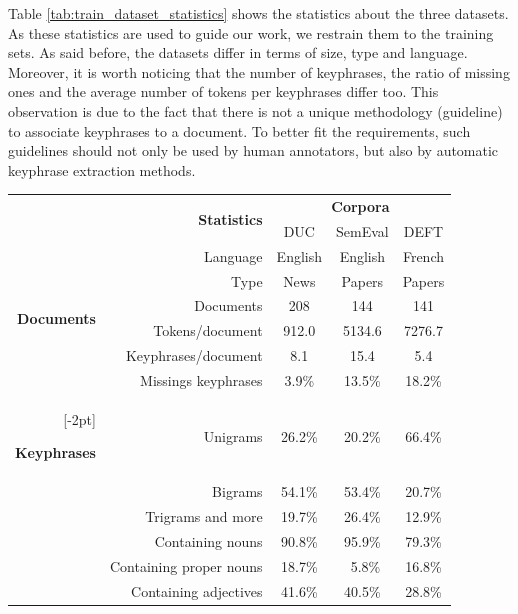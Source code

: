    Table \ref{tab:train_dataset_statistics} shows the statistics about the
    three datasets. As these statistics are used to guide our work, we restrain
    them to the training sets. As said before, the datasets differ in terms of
    size, type and language. Moreover, it is worth noticing that the number of
    keyphrases, the ratio of missing ones and the average number of tokens per
    keyphrases differ too. This observation is due to the fact that there is not
    a unique methodology (guideline) to associate keyphrases to a document. To
    better fit the requirements, such guidelines should not only be used by
    human annotators, but also by automatic keyphrase extraction methods.
    \begin{table}
      \centering
      \begin{tabular}{rrccc}
        \toprule
        & \multirow{2}{*}[-2pt]{\textbf{Statistics}} & \multicolumn{3}{c}{\textbf{Corpora}}\\
        \cmidrule{3-5}
        & & DUC & SemEval & DEFT\\
        \midrule
        \multirow{6}{*}[-2pt]{\begin{sideways}\textbf{Documents}\end{sideways}} & Language & English & English & French\\
        & Type & News & Papers & Papers\\
        & Documents & 208 & 144 & 141\\
        & Tokens/document & 912.0 & 5134.6 & 7276.7\\
        & Keyphrases/document & 8.1 & 15.4 & 5.4\\
        & Missings keyphrases & 3.9\% & 13.5\% & 18.2\%\\
        \addlinespace[1.5\defaultaddspace]
        \multirow{12}{*}[-2pt]{\begin{sideways}\textbf{Keyphrases}\end{sideways}} & Unigrams & 26.2\% & 20.2\% & 66.4\%\\
        & Bigrams & 54.1\% & 53.4\% & 20.7\%\\
        & Trigrams and more & 19.7\% & 26.4\% & 12.9\%\\
        \addlinespace[.75\defaultaddspace]
        & Containing nouns & 90.8\% & 95.9\% & 79.3\%\\
        & Containing proper nouns & 18.7\% & $~~$5.8\% & 16.8\%\\
        & Containing adjectives & 41.6\% & 40.5\% & 28.8\%\\

\end{tabular}
\end{table}
